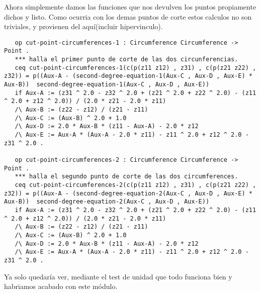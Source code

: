 Ahora simplemente damos las funciones que nos devulven los puntos propiamente dichos y listo. Como ocurria con los demas puntos de corte estos calculos no son triviales, y provienen del aqu\'i(incluir hipervinculo). 

\begin{verbatim}
   op cut-point-circumferences-1 : Circumference Circumference -> Point .
   *** halla el primer punto de corte de las dos circunferencias.
   ceq cut-point-circumferences-1(c(p(z11 z12) , z31) , c(p(z21 z22) , z32)) = p((Aux-A - (second-degree-equation-1(Aux-C , Aux-D , Aux-E) * Aux-B))  second-degree-equation-1(Aux-C , Aux-D , Aux-E))
   if Aux-A := (z31 ^ 2.0 - z32 ^ 2.0 + (z21 ^ 2.0 + z22 ^ 2.0) - (z11 ^ 2.0 + z12 ^ 2.0)) / (2.0 * z21 - 2.0 * z11) 
   /\ Aux-B := (z22 - z12) / (z21 - z11) 
   /\ Aux-C := (Aux-B) ^ 2.0 + 1.0
   /\ Aux-D := 2.0 * Aux-B * (z11 - Aux-A) - 2.0 * z12
   /\ Aux-E := Aux-A * (Aux-A - 2.0 * z11) - z11 ^ 2.0 + z12 ^ 2.0 - z31 ^ 2.0 .

   op cut-point-circumferences-2 : Circumference Circumference -> Point .
   *** halla el segundo punto de corte de las dos circumferences.
   ceq cut-point-circumferences-2(c(p(z11 z12) , z31) , c(p(z21 z22) , z32)) = p((Aux-A - (second-degree-equation-2(Aux-C , Aux-D , Aux-E) * Aux-B))  second-degree-equation-2(Aux-C , Aux-D , Aux-E))
   if Aux-A := (z31 ^ 2.0 - z32 ^ 2.0 + (z21 ^ 2.0 + z22 ^ 2.0) - (z11 ^ 2.0 + z12 ^ 2.0)) / (2.0 * z21 - 2.0 * z11) 
   /\ Aux-B := (z22 - z12) / (z21 - z11) 
   /\ Aux-C := (Aux-B) ^ 2.0 + 1.0
   /\ Aux-D := 2.0 * Aux-B * (z11 - Aux-A) - 2.0 * z12
   /\ Aux-E := Aux-A * (Aux-A - 2.0 * z11) - z11 ^ 2.0 + z12 ^ 2.0 - z31 ^ 2.0 .

\end{verbatim}

Ya solo quedar\'ia ver, mediante el test de unidad que todo funciona bien y habriamos acabado con este m\'odulo.\\

